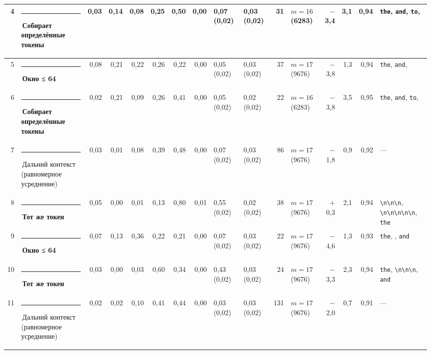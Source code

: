 \documentclass[10pt]{article}
\begin{document}
\begin{minipage}{\linewidth}
\begin{center}
{\begin{tabular}{|r|l|r|r|r|r|r|r|l|l|r|l|r|r|r|l|}
4 & \textcolor[HTML]{6250D6}{\rule{0.62em}{0.62em}}\,\textbf{Собирает определённые токены} & 0,03 & 0,14 & 0,08 & 0,25 & 0,50 & 0,00 & 0,07 (0,02) & 0,03 (0,02) & 31 & $m{=}16$ (6283) & $-$3,4 & 3,1 & 0,94 & \texttt{\textvisiblespace{}the}, \texttt{\textvisiblespace{}and}, \texttt{\textvisiblespace{}to}, \texttt{\textvisiblespace{}} \\ \hline
5 & \textcolor[HTML]{EDA100}{\rule{0.62em}{0.62em}}\,\textbf{Окно ≤ 64} & 0,08 & 0,21 & 0,22 & 0,26 & 0,22 & 0,00 & 0,05 (0,02) & 0,03 (0,02) & 37 & $m{=}17$ (9676) & $-$3,8 & 1,3 & 0,94 & \texttt{\textvisiblespace{}the}, \texttt{\textvisiblespace{}and}, \texttt{\textvisiblespace{}} \\ \hline
6 & \textcolor[HTML]{6250D6}{\rule{0.62em}{0.62em}}\,\textbf{Собирает определённые токены} & 0,02 & 0,21 & 0,09 & 0,26 & 0,41 & 0,00 & 0,05 (0,02) & 0,02 (0,02) & 22 & $m{=}16$ (6283) & $-$3,8 & 3,5 & 0,95 & \texttt{\textvisiblespace{}the}, \texttt{\textvisiblespace{}and}, \texttt{\textvisiblespace{}to}, \texttt{\textvisiblespace{}} \\ \hline
7 & \textcolor[HTML]{C3C2B7}{\rule{0.62em}{0.62em}}\,Дальний контекст (равномерное усреднение) & 0,03 & 0,01 & 0,08 & 0,39 & 0,48 & 0,00 & 0,07 (0,02) & 0,03 (0,02) & 86 & $m{=}17$ (9676) & $-$1,8 & 0,9 & 0,92 & — \\ \hline
8 & \textcolor[HTML]{E87BA4}{\rule{0.62em}{0.62em}}\,\textbf{Тот же токен} & 0,05 & 0,00 & 0,01 & 0,13 & 0,80 & 0,01 & 0,55 (0,02) & 0,02 (0,02) & 38 & $m{=}17$ (9676) & $+$0,3 & 2,1 & 0,94 & \texttt{\textvisiblespace{}\textbackslash{}n\textbackslash{}n\textbackslash{}n}, \texttt{\textbackslash{}n\textbackslash{}n\textbackslash{}n\textbackslash{}n\textbackslash{}n}, \texttt{\textvisiblespace{}the} \\ \hline
9 & \textcolor[HTML]{EDA100}{\rule{0.62em}{0.62em}}\,\textbf{Окно ≤ 64} & 0,07 & 0,13 & 0,36 & 0,22 & 0,21 & 0,00 & 0,07 (0,02) & 0,03 (0,02) & 22 & $m{=}17$ (9676) & $-$4,6 & 1,3 & 0,93 & \texttt{\textvisiblespace{}the}, \texttt{\textvisiblespace{}}, \texttt{\textvisiblespace{}and} \\ \hline
10 & \textcolor[HTML]{E87BA4}{\rule{0.62em}{0.62em}}\,\textbf{Тот же токен} & 0,03 & 0,00 & 0,03 & 0,60 & 0,34 & 0,00 & 0,43 (0,02) & 0,03 (0,02) & 24 & $m{=}17$ (9676) & $-$3,3 & 2,3 & 0,94 & \texttt{\textvisiblespace{}the}, \texttt{\textvisiblespace{}\textbackslash{}n\textbackslash{}n\textbackslash{}n}, \texttt{\textvisiblespace{}and} \\ \hline
11 & \textcolor[HTML]{C3C2B7}{\rule{0.62em}{0.62em}}\,Дальний контекст (равномерное усреднение) & 0,02 & 0,02 & 0,10 & 0,41 & 0,44 & 0,00 & 0,03 (0,02) & 0,03 (0,02) & 131 & $m{=}17$ (9676) & $-$2,0 & 0,7 & 0,91 & — \\ \hline

\end{tabular}}
\end{center}
\end{minipage}
\end{document}
